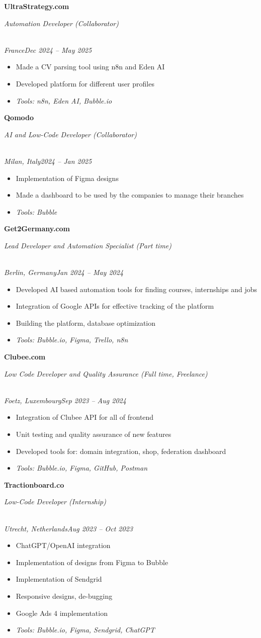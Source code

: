 \documentclass[a4paper,10pt]{article}
\newcommand{\role}[4]{\vspace{3pt}\noindent\hspace{0.6em}\parbox[t]{0.38\textwidth}{\raggedright\textbf{#1}}\hfill\parbox[t]{0.58\textwidth}{\raggedleft\textit{#2}}\\{\textit{#3}\hfill\textit{#4}}\vspace{1pt}}
\begin{document}
\role{UltraStrategy.com}{Automation Developer (Collaborator)}{France}{Dec 2024 -- May 2025}
\begin{itemize}
\item Made a CV parsing tool using n8n and Eden AI
\item Developed platform for different user profiles
\item \textit{Tools: n8n, Eden AI, Bubble.io}
\end{itemize}

\role{Qomodo}{AI and Low-Code Developer (Collaborator)}{Milan, Italy}{2024 -- Jan 2025}
\begin{itemize}
\item Implementation of Figma designs
\item Made a dashboard to be used by the companies to manage their branches
\item \textit{Tools: Bubble}
\end{itemize}

\role{Get2Germany.com}{Lead Developer and Automation Specialist (Part time)}{Berlin, Germany}{Jan 2024 -- May 2024}
\begin{itemize}
\item Developed AI based automation tools for finding courses, internships and jobs
\item Integration of Google APIs for effective tracking of the platform
\item Building the platform, database optimization
\item \textit{Tools: Bubble.io, Figma, Trello, n8n}
\end{itemize}

\role{Clubee.com}{Low Code Developer and Quality Assurance (Full time, Freelance)}{Foetz, Luxembourg}{Sep 2023 -- Aug 2024}
\begin{itemize}
\item Integration of Clubee API for all of frontend
\item Unit testing and quality assurance of new features
\item Developed tools for: domain integration, shop, federation dashboard
\item \textit{Tools: Bubble.io, Figma, GitHub, Postman}
\end{itemize}

\role{Tractionboard.co}{Low-Code Developer (Internship)}{Utrecht, Netherlands}{Aug 2023 -- Oct 2023}
\begin{itemize}
\item ChatGPT/OpenAI integration
\item Implementation of designs from Figma to Bubble
\item Implementation of Sendgrid
\item Responsive designs, de-bugging
\item Google Ads 4 implementation
\item \textit{Tools: Bubble.io, Figma, Sendgrid, ChatGPT}
\end{itemize}
\end{document}
